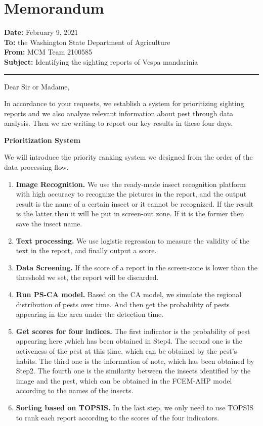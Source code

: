 \section{Memorandum}
\noindent\textbf{Date:} February 9, 2021\\
\textbf{To:} the Washington State Department of Agriculture\\
\textbf{From:} MCM Team 2100585\\
\textbf{Subject:} Identifying the sighting reports of Vespa mandarinia\\
\rule[-7pt]{14.3cm}{0.1em}

\noindent Dear Sir or Madame,

In accordance to your requests, we establish a system for prioritizing sighting reports and we also analyze relevant information about pest through data analysis. 
    Then we are writing to report our key results in these four days.

\centerline{\bf Prioritization System}
We will introduce the priority ranking system we designed from the order of the data processing flow.
\begin{enumerate}
    \item \textbf{Image Recognition.} We use the ready-made insect recognition platform with high accuracy to recognize the pictures in the report, and the output result is the name of a certain insect or it cannot be recognized. If the result is the latter then it will be put in screen-out zone. If it is the former then save the insect name.
    \item \textbf{Text processing.} We use logistic regression to measure the validity of the text in the report, and finally output a score. 
    \item \textbf{Data Screening.} If the score of a report in the screen-zone is lower than the threshold we set, the report will be discarded.
    \item \textbf{Run PS-CA model.} Based on the CA model, we simulate the regional distribution of pests over time. And then get the probability of pests appearing in the area under the detection time.
    \item \textbf{Get scores for four indices.} The first indicator is the probability of pest appearing here ,which has been obtained in Step4. The second one is the activeness of the pest at this time, which can be obtained by the pest’s habits. The third one is the information of note, which has been obtained by Step2. The fourth one is the similarity between the insects identified by the image and the pest, which can be obtained in the FCEM-AHP model according to the names of the insects.
    \item \textbf{Sorting based on TOPSIS.} In the last step, we only need to use TOPSIS to rank each report according to the scores of the four indicators.
\end{enumerate}

